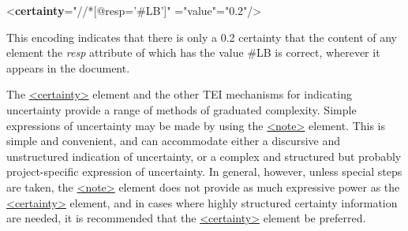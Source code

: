 \par\bgroup{}\exampleFont \begin{shaded}\noindent\mbox{}{<\textbf{certainty}\hspace*{1em}{match}="{//*[@resp='\#LB']}"\mbox{}\newline 
\hspace*{1em}{locus}="{value}"\hspace*{1em}{degree}="{0.2}"/>}\end{shaded}\egroup\par \noindent  This encoding indicates that there is only a 0.2 certainty that the content of any element the {\itshape resp} attribute of which has the value \#LB is correct, wherever it appears in the document.\par
The \hyperref[TEI.certainty]{<certainty>} element and the other TEI mechanisms for indicating uncertainty provide a range of methods of graduated complexity. Simple expressions of uncertainty may be made by using the \hyperref[TEI.note]{<note>} element. This is simple and convenient, and can accommodate either a discursive and unstructured indication of uncertainty, or a complex and structured but probably project-specific expression of uncertainty. In general, however, unless special steps are taken, the \hyperref[TEI.note]{<note>} element does not provide as much expressive power as the \hyperref[TEI.certainty]{<certainty>} element, and in cases where highly structured certainty information are needed, it is recommended that the \hyperref[TEI.certainty]{<certainty>} element be preferred.
